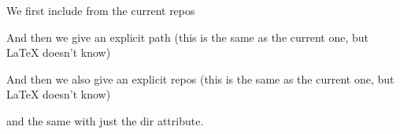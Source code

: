 \documentclass[minimal]{omdoc}
\begin{document}
We first include from the current repos

And then we give an explicit path (this is the same as  the current one, but {\LaTeX}
doesn't know)

And then we also give an explicit repos (this is the same as  the current one, but {\LaTeX}
doesn't know)


and the same with just the dir attribute. 

\end{document}
